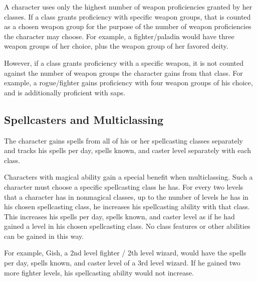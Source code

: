 A character uses only the highest number of weapon proficiencies granted by her classes.
If a class grants proficiency with specific weapon groups, that is counted as a chosen weapon group for the purpose of the number of weapon proficiencies the character may choose.
For example, a fighter/paladin would have three weapon groups of her choice, plus the weapon group of her favored deity.

However, if a class grants proficiency with a specific weapon, it is not counted against the number of weapon groups the character gains from that class.
For example, a rogue/fighter gains proficiency with four weapon groups of his choice, and is additionally proficient with saps.

\subsection{Spellcasters and Multiclassing}\label{Spellcasters and Multiclassing}
The character gains spells from all of his or her spellcasting classes separately and tracks his spells per day, spells known, and caster level separately with each class.

Characters with magical ability gain a special benefit when multiclassing.
Such a character must choose a specific spellcasting class he has.
For every two levels that a character has in nonmagical classes, up to the number of levels he has in his chosen spellcasting class, he increases his spellcasting ability with that class.
This increases his spells per day, spells known, and caster level as if he had gained a level in his chosen spellcasting class.
No class features or other abilities can be gained in this way.


For example, Gish, a 2nd level fighter / 2th level wizard, would have the spells per day, spells known, and caster level of a 3rd level wizard.
If he gained two more fighter levels, his spellcasting ability would not increase.

